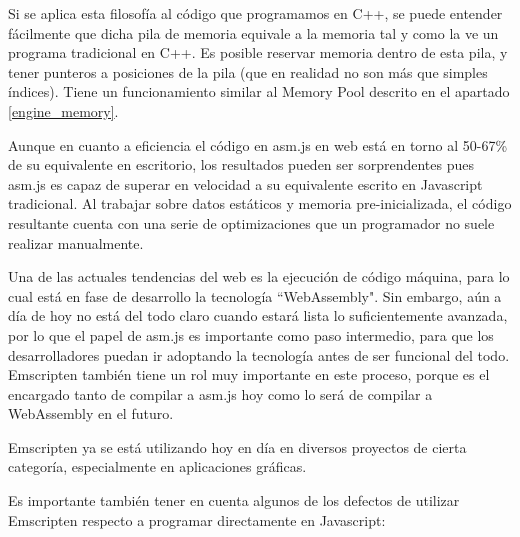 Si se aplica esta filosofía al código que programamos en C++, se puede entender fácilmente que dicha pila de memoria equivale a la memoria tal y como la ve un programa tradicional en C++. Es posible reservar memoria dentro de esta pila, y tener punteros a posiciones de la pila (que en realidad no son más que simples índices). Tiene un funcionamiento similar al Memory Pool descrito en el apartado \ref{engine_memory}.

Aunque en cuanto a eficiencia el código en asm.js en web está en torno al 50-67\% de su equivalente en escritorio, los resultados pueden ser sorprendentes pues asm.js es capaz de superar en velocidad a su equivalente escrito en Javascript tradicional. Al trabajar sobre datos estáticos y memoria pre-inicializada, el código resultante cuenta con una serie de optimizaciones que un programador no suele realizar manualmente.

Una de las actuales tendencias del web es la ejecución de código máquina, para lo cual está en fase de desarrollo la tecnología ``WebAssembly". Sin embargo, aún a día de hoy no está del todo claro cuando estará lista lo suficientemente avanzada, por lo que el papel de asm.js es importante como paso intermedio, para que los desarrolladores puedan ir adoptando la tecnología antes de ser funcional del todo. Emscripten también tiene un rol muy importante en este proceso, porque es el encargado tanto de compilar a asm.js hoy como lo será de compilar a WebAssembly en el futuro.

Emscripten ya se está utilizando hoy en día en diversos proyectos de cierta categoría, especialmente en aplicaciones gráficas.

Es importante también tener en cuenta algunos de los defectos de utilizar Emscripten respecto a programar directamente en Javascript:

